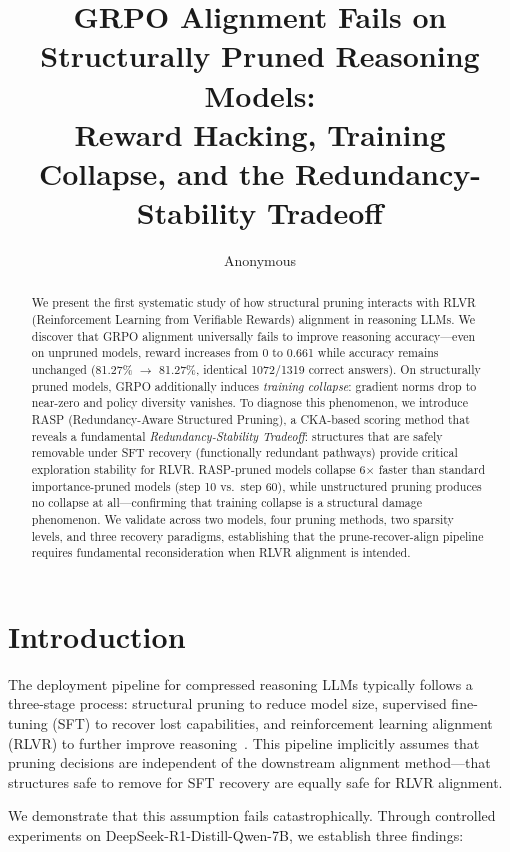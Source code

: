 \documentclass[11pt,a4paper]{article}
\title{GRPO Alignment Fails on Structurally Pruned Reasoning Models:\\Reward Hacking, Training Collapse, and the Redundancy-Stability Tradeoff}
\author{Anonymous}
\begin{document}
\maketitle

\begin{abstract}
We present the first systematic study of how structural pruning interacts with RLVR (Reinforcement Learning from Verifiable Rewards) alignment in reasoning LLMs. We discover that GRPO alignment universally fails to improve reasoning accuracy---even on unpruned models, reward increases from 0 to 0.661 while accuracy remains unchanged (81.27\% $\rightarrow$ 81.27\%, identical 1072/1319 correct answers). On structurally pruned models, GRPO additionally induces \emph{training collapse}: gradient norms drop to near-zero and policy diversity vanishes. To diagnose this phenomenon, we introduce RASP (Redundancy-Aware Structured Pruning), a CKA-based scoring method that reveals a fundamental \emph{Redundancy-Stability Tradeoff}: structures that are safely removable under SFT recovery (functionally redundant pathways) provide critical exploration stability for RLVR. RASP-pruned models collapse 6$\times$ faster than standard importance-pruned models (step 10 vs.\ step 60), while unstructured pruning produces no collapse at all---confirming that training collapse is a structural damage phenomenon. We validate across two models, four pruning methods, two sparsity levels, and three recovery paradigms, establishing that the prune-recover-align pipeline requires fundamental reconsideration when RLVR alignment is intended.
\end{abstract}

\section{Introduction}

The deployment pipeline for compressed reasoning LLMs typically follows a three-stage process: structural pruning to reduce model size, supervised fine-tuning (SFT) to recover lost capabilities, and reinforcement learning alignment (RLVR) to further improve reasoning~\cite{self-healing-2025}. This pipeline implicitly assumes that pruning decisions are independent of the downstream alignment method---that structures safe to remove for SFT recovery are equally safe for RLVR alignment.

We demonstrate that this assumption fails catastrophically. Through controlled experiments on DeepSeek-R1-Distill-Qwen-7B, we establish three findings:
\end{document}
